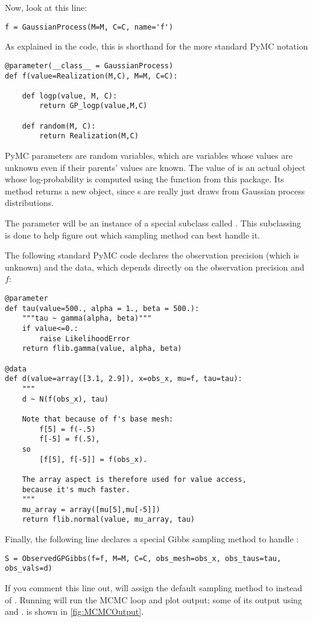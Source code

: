 \documentclass{manual}
\begin{document}
Now, look at this line:
\begin{verbatim}
f = GaussianProcess(M=M, C=C, name='f')
\end{verbatim}
As explained in the code, this is shorthand for the more standard PyMC notation
\begin{verbatim}
@parameter(__class__ = GaussianProcess)
def f(value=Realization(M,C), M=M, C=C):

    def logp(value, M, C):
        return GP_logp(value,M,C)

    def random(M, C):
        return Realization(M,C)
\end{verbatim}
PyMC parameters are random variables, which are variables whose values are unknown even if their parents' values are known. The value of  is an actual  object whose log-probability is computed using the  function from this package. Its  method returns a new  object, since s are really just draws from Gaussian process distributions.

The parameter  will be an instance of a special  subclass called . This subclassing is done to help  figure out which sampling method can best handle it. 

The following standard PyMC code declares the observation precision (which is unknown) and the data, which depends directly on the observation precision and $f$:
\begin{verbatim}
@parameter
def tau(value=500., alpha = 1., beta = 500.):
    """tau ~ gamma(alpha, beta)"""
    if value<=0.:
        raise LikelihoodError
    return flib.gamma(value, alpha, beta)

@data
def d(value=array([3.1, 2.9]), x=obs_x, mu=f, tau=tau):
    """
    d ~ N(f(obs_x), tau)

    Note that because of f's base mesh:
        f[5] = f(-.5)
        f[-5] = f(.5),
    so
        [f[5], f[-5]] = f(obs_x).
        
    The array aspect is therefore used for value access,
    because it's much faster.
    """
    mu_array = array([mu[5],mu[-5]])
    return flib.normal(value, mu_array, tau)
\end{verbatim}

Finally, the following line declares a special Gibbs sampling method to handle :
\begin{verbatim}
S = ObservedGPGibbs(f=f, M=M, C=C, obs_mesh=obs_x, obs_taus=tau, obs_vals=d)
\end{verbatim}
If you comment this line out,  will assign the default  sampling method to  instead of . Running  will run the MCMC loop and plot output; some of its output using  and . is shown in \ref{fig:MCMCOutput}. 
\end{document}
